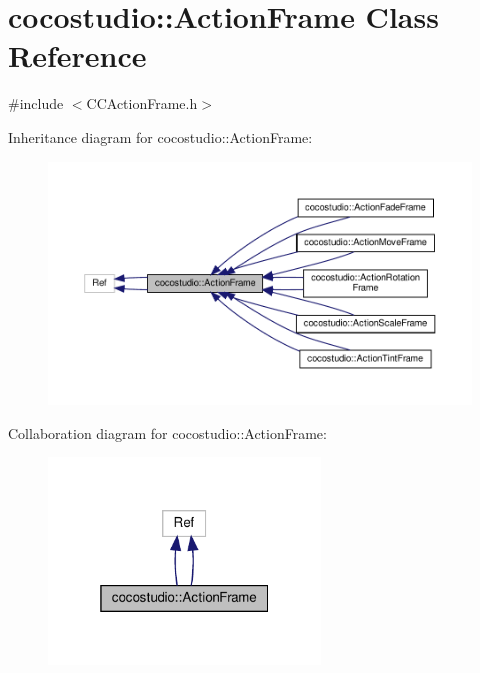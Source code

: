 \hypertarget{classcocostudio_1_1ActionFrame}{}\section{cocostudio\+:\+:Action\+Frame Class Reference}
\label{classcocostudio_1_1ActionFrame}


{\ttfamily \#include $<$C\+C\+Action\+Frame.\+h$>$}



Inheritance diagram for cocostudio\+:\+:Action\+Frame\+:
\nopagebreak
\begin{figure}[H]
\begin{center}
\leavevmode
\includegraphics[width=350pt]{classcocostudio_1_1ActionFrame__inherit__graph}
\end{center}
\end{figure}


Collaboration diagram for cocostudio\+:\+:Action\+Frame\+:
\nopagebreak
\begin{figure}[H]
\begin{center}
\leavevmode
\includegraphics[width=205pt]{classcocostudio_1_1ActionFrame__coll__graph}
\end{center}
\end{figure}
